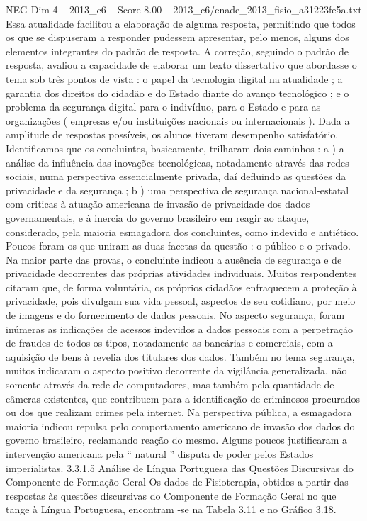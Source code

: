 \begin{textsample}{NEG Dim 4 – 2013\_c6 – Score 8.00 – 2013\_c6/enade\_2013\_fisio\_a31223fe5a.txt}
Essa atualidade facilitou a elaboração de alguma resposta, permitindo que todos os que se dispuseram a responder pudessem apresentar, pelo menos, alguns dos elementos integrantes do padrão de resposta.
A correção, seguindo o padrão de resposta, avaliou a capacidade de elaborar um texto dissertativo que abordasse o tema sob três pontos de vista : o papel da tecnologia digital na atualidade ; a garantia dos direitos do cidadão e do Estado diante do avanço tecnológico ; e o problema da segurança digital para o indivíduo, para o Estado e para as organizações ( empresas e/ou instituições nacionais ou internacionais ).
Dada a amplitude de respostas possíveis, os alunos tiveram desempenho satisfatório.
Identificamos que os concluintes, basicamente, trilharam dois caminhos : a ) a análise da influência das inovações tecnológicas, notadamente através das redes sociais, numa perspectiva essencialmente privada, daí defluindo as questões da privacidade e da segurança ; b ) uma perspectiva de segurança nacional-estatal com criticas à atuação americana de invasão de privacidade dos dados governamentais, e à inercia do governo brasileiro em reagir ao ataque, considerado, pela maioria esmagadora dos concluintes, como indevido e antiético.
Poucos foram os que uniram as duas facetas da questão : o público e o privado.
Na maior parte das provas, o concluinte indicou a ausência de segurança e de privacidade decorrentes das próprias atividades individuais.
Muitos respondentes citaram que, de forma voluntária, os próprios cidadãos enfraquecem a proteção à privacidade, pois divulgam sua vida pessoal, aspectos de seu cotidiano, por meio de imagens e do fornecimento de dados pessoais.
No aspecto segurança, foram inúmeras as indicações de acessos indevidos a dados pessoais com a perpetração de fraudes de todos os tipos, notadamente as bancárias e comerciais, com a aquisição de bens à revelia dos titulares dos dados.
Também no tema segurança, muitos indicaram o aspecto positivo decorrente da vigilância generalizada, não somente através da rede de computadores, mas também pela quantidade de câmeras existentes, que contribuem para a identificação de criminosos procurados ou dos que realizam crimes pela internet.
Na perspectiva pública, a esmagadora maioria indicou repulsa pelo comportamento americano de invasão dos dados do governo brasileiro, reclamando reação do mesmo.
Alguns poucos justificaram a intervenção americana pela “ natural ” disputa de poder pelos Estados imperialistas. 3.3.1.5 Análise de Língua Portuguesa das Questões Discursivas do Componente de Formação Geral Os dados de Fisioterapia, obtidos a partir das respostas às questões discursivas do Componente de Formação Geral no que tange à Língua Portuguesa, encontram -se na Tabela 3.11 e no Gráfico 3.18.

\end{textsample}
